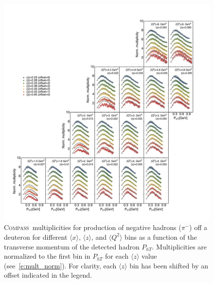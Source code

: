 \documentclass[aps,preprintnumbers,showpacs,nofootinbib,superscriptaddress,floatfix]{revtex4}
\newcommand{\compass}{\textsc{Compass}}
\begin{document}
\begin{figure}[h!]
\begin{center}
\includegraphics[width=\textwidth]{plots/COMPASS_SCIplot_flINDEP_Piminus.pdf}
\end{center}
\caption{\compass\ multiplicities for production of negative hadrons ($\pi^-$) off a deuteron for different $\langle x \rangle$, $\langle z \rangle$, and $\langle Q^2 \rangle$ bins as a function of the transverse momentum of the detected hadron  $P_{hT}$. Multiplicities are normalized to the first bin in $P_{hT}$ for each $\langle z \rangle$ value (see~\eqref{e:mult_norm}). For clarity, each $\langle z \rangle$  bin has been shifted by an offset indicated in the legend.} 
\label{f:C_pim}
\end{figure}
\end{document}
